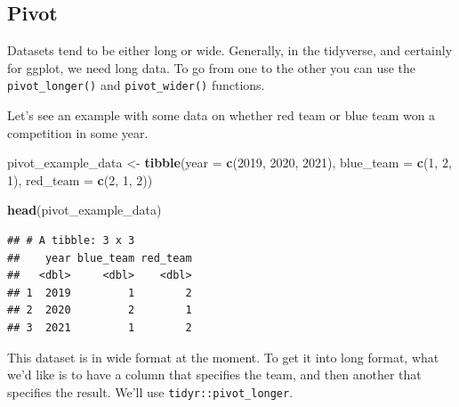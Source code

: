\documentclass[
]{book}
\newenvironment{Shaded}{\begin{snugshade}}{\end{snugshade}}
\newcommand{\DataTypeTok}[1]{\textcolor[rgb]{0.13,0.29,0.53}{#1}}
\newcommand{\DecValTok}[1]{\textcolor[rgb]{0.00,0.00,0.81}{#1}}
\newcommand{\KeywordTok}[1]{\textcolor[rgb]{0.13,0.29,0.53}{\textbf{#1}}}
\newcommand{\NormalTok}[1]{#1}
\newcommand{\OperatorTok}[1]{\textcolor[rgb]{0.81,0.36,0.00}{\textbf{#1}}}
\newcommand{\StringTok}[1]{\textcolor[rgb]{0.31,0.60,0.02}{#1}}
\begin{document}
\hypertarget{pivot}{%
\subsection{Pivot}\label{pivot}}

Datasets tend to be either long or wide. Generally, in the tidyverse, and certainly for ggplot, we need long data. To go from one to the other you can use the \texttt{pivot\_longer()} and \texttt{pivot\_wider()} functions.

Let's see an example with some data on whether red team or blue team won a competition in some year.

\begin{Shaded}
\begin{Highlighting}[]
\NormalTok{pivot_example_data <-}\StringTok{ }
\StringTok{  }\KeywordTok{tibble}\NormalTok{(}\DataTypeTok{year =} \KeywordTok{c}\NormalTok{(}\DecValTok{2019}\NormalTok{, }\DecValTok{2020}\NormalTok{, }\DecValTok{2021}\NormalTok{),}
         \DataTypeTok{blue_team =} \KeywordTok{c}\NormalTok{(}\DecValTok{1}\NormalTok{, }\DecValTok{2}\NormalTok{, }\DecValTok{1}\NormalTok{),}
         \DataTypeTok{red_team =} \KeywordTok{c}\NormalTok{(}\DecValTok{2}\NormalTok{, }\DecValTok{1}\NormalTok{, }\DecValTok{2}\NormalTok{))}

\KeywordTok{head}\NormalTok{(pivot_example_data)}
\end{Highlighting}
\end{Shaded}

\begin{verbatim}
## # A tibble: 3 x 3
##    year blue_team red_team
##   <dbl>     <dbl>    <dbl>
## 1  2019         1        2
## 2  2020         2        1
## 3  2021         1        2
\end{verbatim}

This dataset is in wide format at the moment. To get it into long format, what we'd like is to have a column that specifies the team, and then another that specifies the result. We'll use \texttt{tidyr::pivot\_longer}.

\begin{Shaded}
\end{Shaded}
\end{document}
